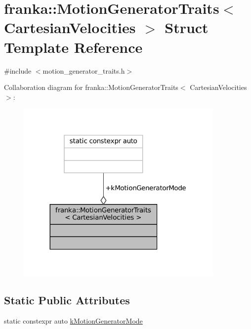 \hypertarget{structfranka_1_1MotionGeneratorTraits_3_01CartesianVelocities_01_4}{}\section{franka\+:\+:Motion\+Generator\+Traits$<$ Cartesian\+Velocities $>$ Struct Template Reference}
\label{structfranka_1_1MotionGeneratorTraits_3_01CartesianVelocities_01_4}


{\ttfamily \#include $<$motion\+\_\+generator\+\_\+traits.\+h$>$}



Collaboration diagram for franka\+:\+:Motion\+Generator\+Traits$<$ Cartesian\+Velocities $>$\+:
\nopagebreak
\begin{figure}[H]
\begin{center}
\leavevmode
\includegraphics[width=287pt]{structfranka_1_1MotionGeneratorTraits_3_01CartesianVelocities_01_4__coll__graph}
\end{center}
\end{figure}
\subsection*{Static Public Attributes}
\begin{DoxyCompactItemize}
\item 
static constexpr auto \hyperlink{structfranka_1_1MotionGeneratorTraits_3_01CartesianVelocities_01_4_ae95b58e391e5052219e2ea0506a76851}{k\+Motion\+Generator\+Mode}
\end{DoxyCompactItemize}


